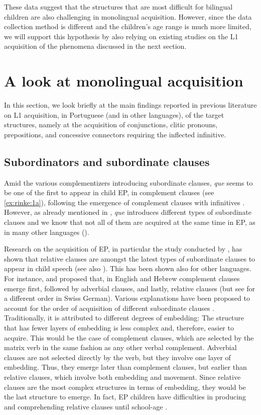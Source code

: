 \documentclass[output=paper]{langscibook}
\begin{document}
These data suggest that the structures that are most difficult for bilingual children are also challenging in monolingual acquisition. However, since the data collection method is different and the children's age range is much more limited, we will support this hypothesis by also relying on existing studies on the L1 acquisition of the phenomena discussed in the next section. 

\section{A look at monolingual acquisition}\label{sec:rinke:3}

In this section, we look briefly at the main findings reported in previous literature on L1 acquisition, in Portuguese (and in other languages), of the target structures, namely at the acquisition of conjunctions, clitic pronouns, prepositions, and concessive connectors requiring the inflected infinitive.

\subsection{Subordinators and subordinate clauses}\label{sec:rinke:3.1}

Amid the various complementizers introducing subordinate clauses, \textit{que} seems to be one of the first to appear in child EP, in complement clauses (see \ref{ex:rinke:1a}), following the emergence of complement clauses with infinitives \citep{Santos2017}. However, as already mentioned in , \textit{que} introduces different types of subordinate clauses and we know that not all of them are acquired at the same time in EP, as in many other languages (\citealt{Soares1998}). 

Research on the acquisition of EP, in particular the study conducted by \citet{Soares1998}, has shown that relative clauses are amongst the latest types of subordinate clauses to appear in child speech (see also \citealt{Vasconcelos1995}). This has been shown also for other languages. For instance, \citet{BloomHafitz1980} and \citet{DromiBerman1986} proposed that, in English and Hebrew complement clauses emerge first, followed by adverbial clauses, and lastly, relative clauses (but see \citealt{Penner1995} for a different order in Swiss German). Various explanations have been proposed to account for the order of acquisition of different subordinate clauses \citep{Bowerman1979}. Traditionally, it is attributed to different degrees of embedding: The structure that has fewer layers of embedding is less complex and, therefore, easier to acquire. This would be the case of complement clauses, which are selected by the matrix verb in the same fashion as any other verbal complement. Adverbial clauses are not selected directly by the verb, but they involve one layer of embedding. Thus, they emerge later than complement clauses, but earlier than relative clauses, which involve both embedding and movement. Since relative clauses are the most complex structures in terms of embedding, they would be the last structure to emerge. In fact, EP children have difficulties in producing and comprehending relative clauses until school-age \citep{Vasconcelos1995}. 
\end{document}
